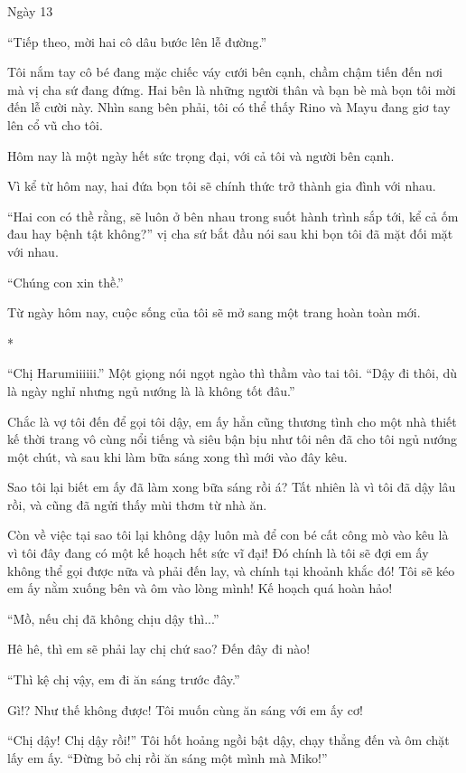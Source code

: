 {Ngày 13}
{


``Tiếp theo, mời hai cô dâu bước lên lễ đường.''

Tôi nắm tay cô bé đang mặc chiếc váy cưới bên cạnh, chầm chậm tiến đến
nơi mà vị cha sứ đang đứng. Hai bên là những người thân và bạn bè mà bọn
tôi mời đến lễ cười này. Nhìn sang bên phải, tôi có thể thấy Rino và
Mayu đang giơ tay lên cổ vũ cho tôi.

Hôm nay là một ngày hết sức trọng đại, với cả tôi và người bên cạnh.

Vì kể từ hôm nay, hai đứa bọn tôi sẽ chính thức trở thành gia đình với
nhau.

``Hai con có thề rằng, sẽ luôn ở bên nhau trong suốt hành trình sắp tới,
kể cả ốm đau hay bệnh tật không?'' vị cha sứ bắt đầu nói sau khi bọn tôi
đã mặt đối mặt với nhau.

``Chúng con xin thề.''

Từ ngày hôm nay, cuộc sống của tôi sẽ mở sang một trang hoàn toàn mới.

*

``Chị Harumiiiiii.'' Một giọng nói ngọt ngào thì thầm vào tai tôi. ``Dậy
đi thôi, dù là ngày nghỉ nhưng ngủ nướng là là không tốt đâu.''

Chắc là vợ tôi đến để gọi tôi dậy, em ấy hẳn cũng thương tình cho một
nhà thiết kế thời trang vô cùng nổi tiếng và siêu bận bịu như tôi nên đã
cho tôi ngủ nướng một chút, và sau khi làm bữa sáng xong thì mới vào đây
kêu.

Sao tôi lại biết em ấy đã làm xong bữa sáng rồi á? Tất nhiên là vì tôi
đã dậy lâu rồi, và cũng đã ngửi thấy mùi thơm từ nhà ăn.

Còn về việc tại sao tôi lại không dậy luôn mà để con bé cất công mò vào
kêu là vì tôi đây đang có một kế hoạch hết sức vĩ đại! Đó chính là tôi
sẽ đợi em ấy không thể gọi được nữa và phải đến lay, và chính tại khoảnh
khắc đó! Tôi sẽ kéo em ấy nằm xuống bên và ôm vào lòng mình! Kế hoạch
quá hoàn hảo!

``Mồ, nếu chị đã không chịu dậy thì...''

Hê hê, thì em sẽ phải lay chị chứ sao? Đến đây đi nào!

``Thì kệ chị vậy, em đi ăn sáng trước đây.''

Gì!? Như thế không được! Tôi muốn cùng ăn sáng với em ấy cơ!

``Chị dậy! Chị dậy rồi!'' Tôi hốt hoảng ngồi bật dậy, chạy thẳng đến và
ôm chặt lấy em ấy. ``Đừng bỏ chị rồi ăn sáng một mình mà Miko!''

}
